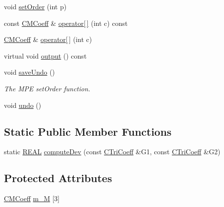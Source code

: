 \begin{DoxyCompactItemize}
\item 
void \hyperlink{classCTriCoeff_a8df569d14c28af368916f6d6258faa35}{set\-Order} (int p)
\item 
const \hyperlink{classCMCoeff}{C\-M\-Coeff} \& \hyperlink{classCTriCoeff_ae1643fb9444f997935013aeef30a7c1e}{operator\mbox{[}$\,$\mbox{]}} (int c) const 
\item 
\hyperlink{classCMCoeff}{C\-M\-Coeff} \& \hyperlink{classCTriCoeff_ad336c1bb46a865f0543c13ec3bf10557}{operator\mbox{[}$\,$\mbox{]}} (int c)
\item 
virtual void \hyperlink{classCTriCoeff_ad4c1064a7de4dd89f81959d842812ee2}{output} () const 
\item 
void \hyperlink{classCTriCoeff_a9886af4188561152d331366cfaec1c53}{save\-Undo} ()
\begin{DoxyCompactList}\small\item\em The M\-P\-E set\-Order function. \end{DoxyCompactList}\item 
void \hyperlink{classCTriCoeff_a8202256093cb071f6ae95887ea1c8dde}{undo} ()
\end{DoxyCompactItemize}
\subsection*{Static Public Member Functions}
\begin{DoxyCompactItemize}
\item 
static \hyperlink{util_8h_a5821460e95a0800cf9f24c38915cbbde}{R\-E\-A\-L} \hyperlink{classCTriCoeff_a5966b12dbe81e9e50f5397647cb18044}{compute\-Dev} (const \hyperlink{classCTriCoeff}{C\-Tri\-Coeff} \&G1, const \hyperlink{classCTriCoeff}{C\-Tri\-Coeff} \&G2)
\end{DoxyCompactItemize}
\subsection*{Protected Attributes}
\begin{DoxyCompactItemize}
\item 
\hyperlink{classCMCoeff}{C\-M\-Coeff} \hyperlink{classCTriCoeff_afac3ecb3b5c965a7ba4cc0409c2100e8}{m\-\_\-\-M} \mbox{[}3\mbox{]}
\end{DoxyCompactItemize}
